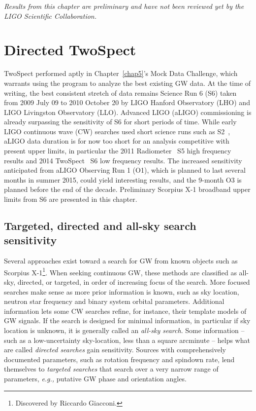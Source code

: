 
\textit{Results from this chapter are preliminary and have not been reviewed yet by the LIGO Scientific Collaboration.}

        \section{Directed TwoSpect}
        \label{directed}

TwoSpect performed aptly in Chapter~\ref{chap5}'s Mock Data Challenge, which warrants using the program to analyze the best existing GW data.
At the time of writing, the best consistent stretch of data remains Science Run 6 (S6) taken from 2009 July 09 to 2010 October 20 by LIGO Hanford Observatory (LHO) and LIGO Livingston Observatory (LLO).
Advanced LIGO (aLIGO) commissioning is already surpassing the sensitivity of S6 for short periods of time.
While early LIGO continuous wave (CW) searches used short science runs such as S2~\cite{AbbottScoX12007}, aLIGO data duration is for now too short for an analysis competitive with present upper limits, in particular the 2011 Radiometer~\cite{AbadieStoch2011} S5 high frequency results and 2014 TwoSpect~\cite{GoetzTwoSpectResults2014} S6 low frequency results.
The increased sensitivity anticipated from aLIGO Observing Run 1 (O1), which is planned to last several months in summer 2015, could yield interesting results, and the 9-month O3 is planned before the end of the decade.
Preliminary Scorpius X-1 broadband upper limits from S6 are presented in this chapter.


            \subsection{Targeted, directed and all-sky search sensitivity}
            \label{tradeoffs}

Several approaches exist toward a search for GW from known objects such as Scorpius X-1\footnote{Discovered by Riccardo Giacconi.}.
When seeking continuous GW, these methods are classified as all-sky, directed, or targeted, in order of increasing focus of the search.
More focused searches make sense as more prior information is known, such as sky location, neutron star frequency and binary system orbital parameters.
Additional information lets some CW searches refine, for instance, their template models of GW signals.
If the search is designed for minimal information, in particular if sky location is unknown, it is generally called an \textit{all-sky search}.
Some information -- such as a low-uncertainty sky-location, less than a square arcminute -- helps what are called \textit{directed searches} gain sensitivity.
Sources with comprehensively documented parameters, such as rotation frequency and spindown rate, lend themselves to \textit{targeted searches} that search over a very narrow range of parameters, \textit{e.g.,} putative GW phase and orientation angles.

